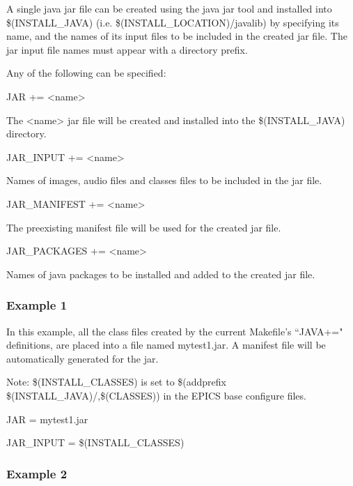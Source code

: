 A single java jar file can be created using the java jar tool and installed into \$(INSTALL\_JAVA) (i.e. 
\$(INSTALL\_LOCATION)/javalib) by specifying its name, and the names of its input files to be included in the created jar 
file. The jar input file names must appear with a directory prefix.

Any of the following can be specified:

\begin{description}\item {}JAR += \textless{}name\textgreater{}

\end{description}The \textless{}name\textgreater{} jar file will be created and installed into the \$(INSTALL\_JAVA) directory.

\begin{description}\item {}JAR\_INPUT += \textless{}name\textgreater{}

\end{description}Names of images, audio files and classes files to be included in the jar file.

\begin{description}\item {}JAR\_MANIFEST += \textless{}name\textgreater{}

\end{description}The preexisting manifest file will be used for the created jar file.

\begin{description}\item JAR\_PACKAGES += \textless{}name\textgreater{}

\end{description}Names of java packages to be installed and added to the created jar file.

\subsubsection{Example 1}

In this example, all the class files created by the current Makefile's ``JAVA+=" definitions, are placed into a file named 
mytest1.jar. A manifest file will be automatically generated for the jar. 

Note: \$(INSTALL\_CLASSES) is set to \$(addprefix \$(INSTALL\_JAVA)/,\$(CLASSES)) in the EPICS base configure 
files.

\begin{description}\item {}JAR = mytest1.jar

\item {}JAR\_INPUT = \$(INSTALL\_CLASSES)

\end{description}\subsubsection{Example 2}

